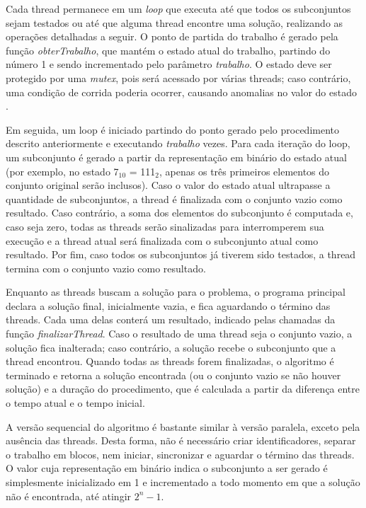 \documentclass[12pt]{article}
\begin{document}
Cada thread permanece em um \textit{loop} que executa até que todos os subconjuntos sejam testados ou até que alguma thread encontre uma solução, realizando as operações detalhadas a seguir. O ponto de partida do trabalho é gerado pela função \textit{obterTrabalho}, que mantém o estado atual do trabalho, partindo do número 1 e sendo incrementado pelo parâmetro \textit{trabalho}. O estado deve ser protegido por uma \textit{mutex}, pois será acessado por várias threads; caso contrário, uma condição de corrida poderia ocorrer, causando anomalias no valor do estado \cite{Lewis1996}.

Em seguida, um loop é iniciado partindo do ponto gerado pelo procedimento descrito anteriormente e executando \textit{trabalho} vezes. Para cada iteração do loop, um subconjunto é gerado a partir da representação em binário do estado atual (por exemplo, no estado 7$_{10}$ = 111$_{2}$, apenas os três primeiros elementos do conjunto original serão inclusos). Caso o valor do estado atual ultrapasse a quantidade de subconjuntos, a thread é finalizada com o conjunto vazio como resultado. Caso contrário, a soma dos elementos do subconjunto é computada e, caso seja zero, todas as threads serão sinalizadas para interromperem sua execução e a thread atual será finalizada com o subconjunto atual como resultado. Por fim, caso todos os subconjuntos já tiverem sido testados, a thread termina com o conjunto vazio como resultado.

Enquanto as threads buscam a solução para o problema, o programa principal declara a solução final, inicialmente vazia, e fica aguardando o término das threads. Cada uma delas conterá um resultado, indicado pelas chamadas da função \textit{finalizarThread}. Caso o resultado de uma thread seja o conjunto vazio, a solução fica inalterada; caso contrário, a solução recebe o subconjunto que a thread encontrou. Quando todas as threads forem finalizadas, o algoritmo é terminado e retorna a solução encontrada (ou o conjunto vazio se não houver solução) e a duração do procedimento, que é calculada a partir da diferença entre o tempo atual e o tempo inicial.

A versão sequencial do algoritmo é bastante similar à versão paralela, exceto pela ausência das threads. Desta forma, não é necessário criar identificadores, separar o trabalho em blocos, nem iniciar, sincronizar e aguardar o término das threads. O valor cuja representação em binário indica o subconjunto a ser gerado é simplesmente inicializado em 1 e incrementado a todo momento em que a solução não é encontrada, até atingir $2^{n} - 1$.
\end{document}

